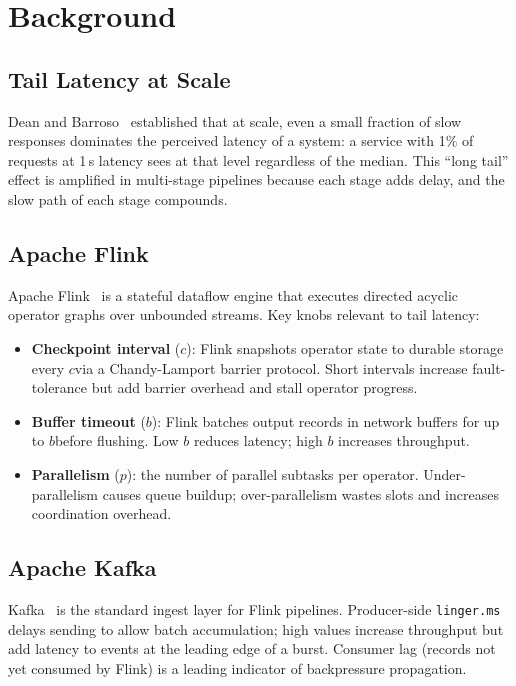\section{Background}
\label{sec:background}

\subsection{Tail Latency at Scale}
Dean and Barroso~\cite{dean2013tail} established that at scale, even a
small fraction of slow responses dominates the perceived latency of a
system: a service with 1\% of requests at 1\,s latency sees 
at that level regardless of the median.
This ``long tail'' effect is amplified in multi-stage pipelines because
each stage adds delay, and the slow path of each stage compounds.

\subsection{Apache Flink}
Apache Flink~\cite{carbone2015flink} is a stateful dataflow engine that
executes directed acyclic operator graphs over unbounded streams.
Key knobs relevant to tail latency:
\begin{itemize}
  \item \textbf{Checkpoint interval} ($c$): Flink snapshots operator
    state to durable storage every $c$\ms via a Chandy-Lamport barrier
    protocol. Short intervals increase fault-tolerance but add barrier
    overhead and stall operator progress.
  \item \textbf{Buffer timeout} ($b$): Flink batches output records in
    network buffers for up to $b$\ms before flushing.
    Low $b$ reduces latency; high $b$ increases throughput.
  \item \textbf{Parallelism} ($p$): the number of parallel subtasks
    per operator. Under-parallelism causes queue buildup; over-parallelism
    wastes slots and increases coordination overhead.
\end{itemize}

\subsection{Apache Kafka}
Kafka~\cite{kreps2011kafka} is the standard ingest layer for Flink
pipelines. Producer-side \texttt{linger.ms} delays sending to allow
batch accumulation; high values increase throughput but add latency to
events at the leading edge of a burst.
Consumer lag (records not yet consumed by Flink) is a leading indicator
of backpressure propagation.


